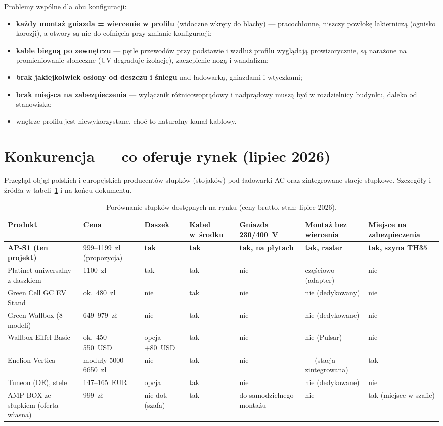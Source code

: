 \documentclass[11pt,a4paper]{article}
\begin{document}
Problemy wspólne dla obu konfiguracji:
\begin{itemize}
\item \textbf{każdy montaż gniazda = wiercenie w profilu} (widoczne wkręty do blachy) --- pracochłonne,
niszczy powłokę lakierniczą (ognisko korozji), a otwory są nie do cofnięcia przy zmianie konfiguracji;
\item \textbf{kable biegną po zewnętrzu} --- pętle przewodów przy podstawie i wzdłuż profilu wyglądają
prowizorycznie, są narażone na promieniowanie słoneczne (UV degraduje izolację), zaczepienie nogą
i wandalizm;
\item \textbf{brak jakiejkolwiek osłony od deszczu i śniegu} nad ładowarką, gniazdami i wtyczkami;
\item \textbf{brak miejsca na zabezpieczenia} --- wyłącznik różnicowoprądowy i nadprądowy muszą być
w rozdzielnicy budynku, daleko od stanowiska;
\item wnętrze profilu jest niewykorzystane, choć to naturalny kanał kablowy.
\end{itemize}

\section{Konkurencja --- co oferuje rynek (lipiec 2026)}
\label{sec:konkurencja}
Przegląd objął polskich i europejskich producentów słupków (stojaków) pod ładowarki AC oraz
zintegrowane stacje słupkowe. Szczegóły i źródła w tabeli~\ref{tab:konkurencja} i na końcu dokumentu.

\begin{table}[h]\small
\caption{Porównanie słupków dostępnych na rynku (ceny brutto, stan: lipiec 2026).}
\label{tab:konkurencja}
\begin{tabular}{p{3.4cm}p{1.9cm}p{1.2cm}p{1.6cm}p{2.0cm}p{1.8cm}p{2.2cm}}
\toprule
Produkt & Cena & Daszek & Kabel w~środku & Gniazda 230/400~V & Montaż bez wiercenia & Miejsce na zabezpieczenia\\
\midrule
\textbf{AP-S1 (ten projekt)} & 999--1199~zł (propozycja) & \textbf{tak} & \textbf{tak} & \textbf{tak, na płytach} & \textbf{tak, raster} & \textbf{tak, szyna TH35}\\
Platinet uniwersalny z daszkiem & 1100~zł & tak & tak & nie & częściowo (adapter) & nie\\
Green Cell GC EV Stand & ok.~480~zł & nie & tak & nie & nie (dedykowany) & nie\\
Green Wallbox (8 modeli) & 649--979~zł & nie & tak & nie & nie (dedykowane) & nie\\
Wallbox Eiffel Basic & ok.~450--550~USD & opcja +80~USD & tak & nie & nie (Pulsar) & nie\\
Enelion Vertica & moduły 5000--6650~zł & nie & tak & nie & --- (stacja zintegrowana) & tak\\
Tuneon (DE), stele & 147--165~EUR & opcja & tak & nie & nie (dedykowane) & nie\\
AMP-BOX ze słupkiem (oferta własna) & 999~zł & nie dot. (szafa) & tak & do samodzielnego montażu & nie & tak (miejsce w szafie)\\
\bottomrule
\end{tabular}
\end{table}
\end{document}

